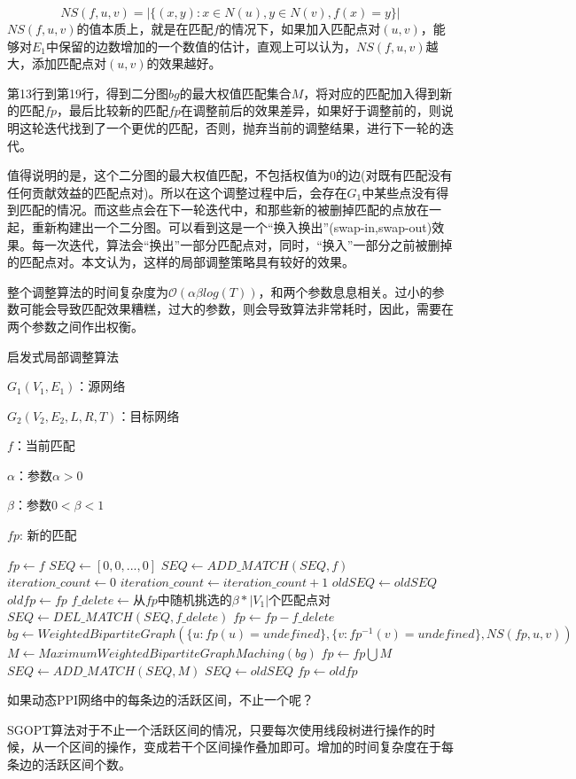 \begin{equation}\label{myworknsdefine}
    NS(f,u,v)=|\{(x,y):x\in N(u),y\in N(v),f(x)=y\}|
\end{equation}
$NS(f,u,v)$的值本质上，就是在匹配$f$的情况下，如果加入匹配点对$(u,v)$，能够对$E_1$中保留的边数增加的一个数值的估计，直观上可以认为，$NS(f,u,v)$越大，添加匹配点对$(u,v)$的效果越好。

第13行到第19行，得到二分图$bg$的最大权值匹配集合$M$，将对应的匹配加入得到新的匹配$fp$，最后比较新的匹配$fp$在调整前后的效果差异，如果好于调整前的，则说明这轮迭代找到了一个更优的匹配，否则，抛弃当前的调整结果，进行下一轮的迭代。

值得说明的是，这个二分图的最大权值匹配，不包括权值为0的边(对既有匹配没有任何贡献效益的匹配点对)。所以在这个调整过程中后，会存在$G_1$中某些点没有得到匹配的情况。而这些点会在下一轮迭代中，和那些新的被删掉匹配的点放在一起，重新构建出一个二分图。可以看到这是一个“换入换出”(swap-in,swap-out)效果。每一次迭代，算法会“换出”一部分匹配点对，同时，“换入”一部分之前被删掉的匹配点对。本文认为，这样的局部调整策略具有较好的效果。

整个调整算法的时间复杂度为$\mathcal{O}(\alpha\beta log(T))$，和两个参数息息相关。过小的参数可能会导致匹配效果糟糕，过大的参数，则会导致算法非常耗时，因此，需要在两个参数之间作出权衡。

\begin{small}
\begin{algorithm}[!htb]
{
\caption{启发式局部调整算法}
\label{alg:1}
    \begin{algorithmic}[1]
    \Require
    $G_1(V_1,E_1)$：源网络
    
    $G_2(V_2,E_2,L,R,T)$：目标网络
    
    $f$：当前匹配
    
    $\alpha$：参数$\alpha>0$
    
    $\beta$：参数$0<\beta<1$
    
    \Ensure
    $fp$: 新的匹配
    
    \State $fp \gets f$
    \State $SEQ \gets [0,0,...,0]$
    \State $SEQ \gets ADD\_MATCH(SEQ,f)$
    \State $iteration\_count \gets 0$
        \State $iteration\_count\gets iteration\_count+1$
        \State $oldSEQ\gets oldSEQ$
        \State $oldfp\gets fp$
        \State $f\_delete\gets$从$fp$中随机挑选的$\beta*|V_1|$个匹配点对
        \State $SEQ\gets DEL\_MATCH(SEQ,f\_delete)$
        \State $fp \gets fp-f\_delete$
        \State $bg\gets WeightedBipartiteGraph(\{u:fp(u)=undefined\},\{v:fp^{-1}(v)=undefined\},NS(fp,u,v))$
        \State $M\gets MaximumWeightedBipartiteGraphMaching(bg)$
        \State $fp\gets fp\bigcup M$
        \State $SEQ\gets ADD\_MATCH(SEQ,M)$
            \State $SEQ\gets oldSEQ$
            \State $fp\gets oldfp$
        \EndIf
    \EndWhile
    \end{algorithmic}    
}
\end{algorithm}
\end{small}

如果动态PPI网络中的每条边的活跃区间，不止一个呢？

SGOPT算法对于不止一个活跃区间的情况，只要每次使用线段树进行操作的时候，从一个区间的操作，变成若干个区间操作叠加即可。增加的时间复杂度在于每条边的活跃区间个数。
